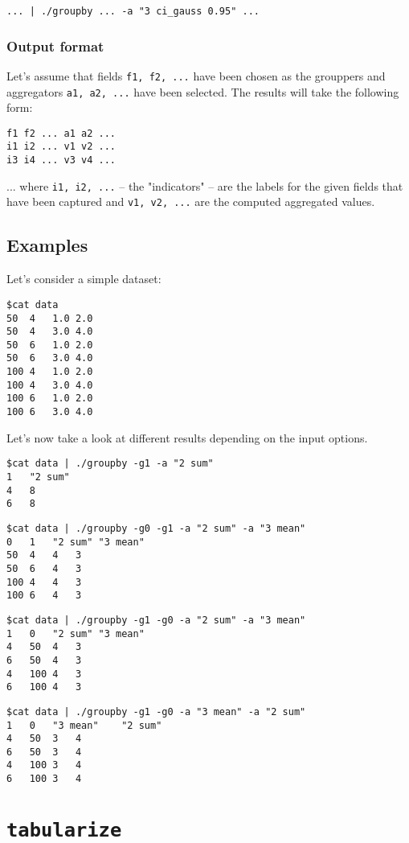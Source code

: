 \documentclass{report}
\begin{document}
\texttt{... | ./groupby ... -a "3 ci\_gauss 0.95" ...}

\subsubsection{Output format}
Let's assume that fields \texttt{f1, f2, ...} have been chosen as the
grouppers and aggregators \texttt{a1, a2, ...} have been selected.
The results will take the following form:
\begin{verbatim}
f1 f2 ... a1 a2 ...
i1 i2 ... v1 v2 ...
i3 i4 ... v3 v4 ...
\end{verbatim}

... where \texttt{i1, i2, ...} -- the "indicators" -- are the labels for
the given fields that have been captured and \texttt{v1, v2, ...} are
the computed aggregated values.

\subsection{Examples}
Let's consider a simple dataset:
\begin{verbatim}
$cat data
50	4	1.0	2.0
50	4	3.0	4.0
50	6	1.0	2.0
50	6	3.0	4.0
100	4	1.0	2.0
100	4	3.0	4.0
100	6	1.0	2.0
100	6	3.0	4.0
\end{verbatim}

Let's now take a look at different results depending on the input options.

\begin{verbatim}
$cat data | ./groupby -g1 -a "2 sum"
1	"2 sum"
4	8
6	8
\end{verbatim}

\begin{verbatim}
$cat data | ./groupby -g0 -g1 -a "2 sum" -a "3 mean"
0	1	"2 sum"	"3 mean"
50	4	4	3
50	6	4	3
100	4	4	3
100	6	4	3
\end{verbatim}

\begin{verbatim}
$cat data | ./groupby -g1 -g0 -a "2 sum" -a "3 mean"
1	0	"2 sum"	"3 mean"
4	50	4	3
6	50	4	3
4	100	4	3
6	100	4	3
\end{verbatim}

\begin{verbatim}
$cat data | ./groupby -g1 -g0 -a "3 mean" -a "2 sum"
1	0	"3 mean"	"2 sum"
4	50	3	4
6	50	3	4
4	100	3	4
6	100	3	4
\end{verbatim}

\section{\texttt{tabularize}}
\end{document}
